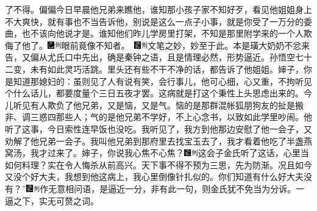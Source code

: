 了不得。偏偏今日早晨他兄弟来瞧他，谁知那小孩子家不知好歹，看见他姐姐身上不大爽快，就有事也不当告诉他，别说是这么一点子小事，就是你受了一万分的委曲，也不该向他说才是。谁知他们昨儿学房里打架，不知是那里附学来的一个人欺侮了他了。{\includegraphics[width=3mm]{../Images/00003}\includegraphics[width=3mm]{../Images/00011}\footnotesize \kaishu 眼前竟像不知者。　\includegraphics[width=3mm]{../Images/00006}\includegraphics[width=3mm]{../Images/00011}\footnotesize \kaishu 文笔之妙，妙至于此。本是璜大奶奶不忿来告，又偏从尤氏口中先出，确是秦钟之语，且是情理必然，形势逼近。孙悟空七十二变，未有如此灵巧活跳。}里头还有些不干不净的话，都告诉了他姐姐。婶子，你是知道那媳妇的：虽则见了人有说有笑，会行事儿，他可心细，心又重，不拘听见个什么话儿，都要度量个三日五夜才罢。这病就是打这个秉性上头思虑出来的。今儿听见有人欺负了他兄弟，又是恼，又是气。恼的是那群混帐狐朋狗友的扯是搬非、调三惑四那些人；气的是他兄弟不学好，不上心念书，以致如此学里吵闹。他听了这事，今日索性连早饭也没吃。我听见了，我方到他那边安慰了他一会子，又劝解了他兄弟一会子。我叫他兄弟到那府里去找宝玉去了，我才看着他吃了半盏燕窝汤，我才过来了。婶子，你说我心焦不心焦？{\includegraphics[width=3mm]{../Images/00006}\includegraphics[width=3mm]{../Images/00011}\footnotesize \kaishu 这会子金氏听了这话，心里当如何料理？实在令人悔杀从前高兴。天下事不得不预为三思，先为防渐。}况且如今又没个好大夫，我想到他这病上，我心里倒像针扎似的。你们知道有什么好大夫没有？''{\includegraphics[width=3mm]{../Images/00006}\includegraphics[width=3mm]{../Images/00011}\footnotesize \kaishu 作无意相问语，是逼近一分，非有此一句，则金氏犹不免当为分诉。一逼之下，实无可赘之词。}


